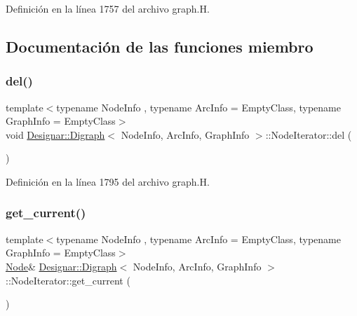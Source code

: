 Definición en la línea 1757 del archivo graph.\+H.



\subsection{Documentación de las funciones miembro}
\mbox{\label{class_designar_1_1_digraph_1_1_node_iterator_a8d68d82384631f601055ef9b742b0dbf}} 
\subsubsection{\texorpdfstring{del()}{del()}}
{\footnotesize\ttfamily template$<$typename Node\+Info , typename Arc\+Info  = Empty\+Class, typename Graph\+Info  = Empty\+Class$>$ \\
void \hyperlink{class_designar_1_1_digraph}{Designar\+::\+Digraph}$<$ Node\+Info, Arc\+Info, Graph\+Info $>$\+::Node\+Iterator\+::del (\begin{DoxyParamCaption}{ }\end{DoxyParamCaption})\hspace{0.3cm}{\ttfamily [inline]}}



Definición en la línea 1795 del archivo graph.\+H.

\mbox{\label{class_designar_1_1_digraph_1_1_node_iterator_a2d9961869a4ec52a112354600094646c}} 
\subsubsection{\texorpdfstring{get\+\_\+current()}{get\_current()}\hspace{0.1cm}{\footnotesize\ttfamily [1/2]}}
{\footnotesize\ttfamily template$<$typename Node\+Info , typename Arc\+Info  = Empty\+Class, typename Graph\+Info  = Empty\+Class$>$ \\
\hyperlink{class_designar_1_1_digraph_a4dc921c41a480b7946a04170e997d8ae}{Node}\& \hyperlink{class_designar_1_1_digraph}{Designar\+::\+Digraph}$<$ Node\+Info, Arc\+Info, Graph\+Info $>$\+::Node\+Iterator\+::get\+\_\+current (\begin{DoxyParamCaption}{ }\end{DoxyParamCaption})\hspace{0.3cm}{\ttfamily [inline]}}



